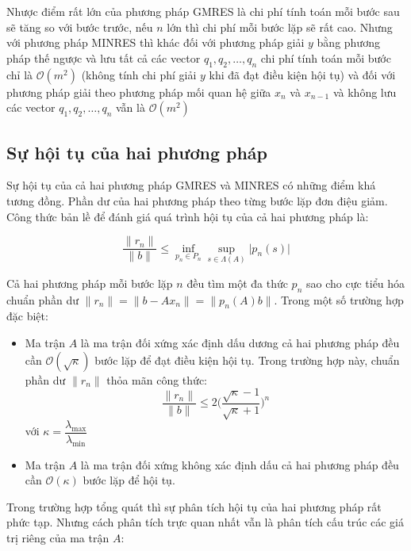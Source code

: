 \documentclass[14pt, a4paper]{article}
\numberwithin{equation}{section}
\numberwithin{algorithm}{section}
\numberwithin{figure}{section}
\numberwithin{dl}{section}
\numberwithin{md}{section}
\numberwithin{bd}{section}
\numberwithin{dn}{section}
\begin{document}
Nhược điểm rất lớn của phương pháp GMRES là chi phí tính toán mỗi bước sau sẽ tăng so với bước trước, nếu $n$ lớn thì chi phí mỗi bước lặp sẽ rất cao. Nhưng với phương pháp MINRES thì khác đối với phương pháp giải $y$ bằng phương pháp thế ngược và lưu tất cả các vector $q_1, q_2, \dots, q_n$ chi phí tính toán mỗi bước chỉ là $\mathcal{O}(m^2)$ (không tính chi phí giải $y$ khi đã đạt điều kiện hội tụ) và đối với phương pháp giải theo phương pháp mối quan hệ giữa $x_n$ và $x_{n-1}$ và không lưu các vector $q_1, q_2, \dots, q_n$ vẫn là $\mathcal{O}(m^2)$

\subsection{Sự hội tụ của hai phương pháp}

Sự hội tụ của cả hai phương pháp GMRES và MINRES có những điểm khá tương đồng. Phần dư của hai phương pháp theo từng bước lặp đơn điệu giảm. Công thức bản lề để đánh giá quá trình hội tụ của cả hai phương pháp là:

\begin{equation}
    \dfrac{\lVert r_n \rVert}{\lVert b \rVert} \leq \inf_{p_n \in P_n} \sup_{s \in \Lambda(A)} \lvert p_n(s) \rvert
\end{equation}

Cả hai phương pháp mỗi bước lặp $n$ đều tìm một đa thức $p_n$ sao cho cực tiểu hóa chuẩn phần dư $\lVert r_n \rVert=\lVert b - Ax_n \rVert=\lVert p_n(A)b \rVert$. Trong một số trường hợp đặc biệt:

\begin{itemize}
    \item Ma trận $A$ là ma trận đối xứng xác định dấu dương cả hai phương pháp đều cần $\mathcal{O}(\sqrt{\kappa})$ bước lặp để đạt điều kiện hội tụ. Trong trường hợp này, chuẩn phần dư $\lVert r_n \lVert$ thỏa mãn công thức:
    \begin{equation}
        \dfrac{\lVert r_n \rVert }{\lVert b \rVert} \leq 2\Big(\dfrac{\sqrt{\kappa} - 1}{\sqrt{\kappa} + 1}\Big)^n
    \end{equation}
    với $\kappa=\dfrac{\lambda_{\max}}{\lambda_{\min}}$
    \item Ma trận $A$ là ma trận đối xứng không xác định dấu cả hai phương pháp đều cần $\mathcal{O}(\kappa)$ bước lặp để hội tụ.
\end{itemize}

Trong trường hợp tổng quát thì sự phân tích hội tụ của hai phương pháp rất phức tạp. Nhưng cách phân tích trực quan nhất vẫn là phân tích cấu trúc các giá trị riêng của ma trận $A$:
\end{document}
